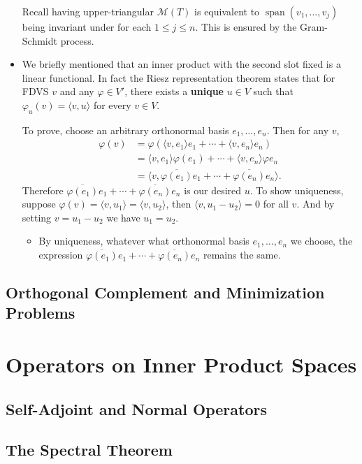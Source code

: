 \documentclass{article}
\newcommand{\s}{\operatorname{span}}
\newcommand{\conj}[1]{\overline{#1}}
\newcommand{\inp}[2]{\langle #1, #2 \rangle}
\newcommand{\M}{\mathcal{M}}
\renewcommand{\phi}{\varphi}
\begin{document}
\begin{itemize}
    Recall having upper-triangular $\M(T)$ is equivalent to $\s(v_1,\dots,v_j)$ being invariant under for each $1 \leq j \leq n$. This is ensured by the Gram-Schmidt process.
    
    
    \item We briefly mentioned that an inner product with the second slot fixed is a linear functional. In fact the Riesz representation theorem states that for FDVS $v$ and any $\phi \in V'$, there exists a \textbf{unique} $u \in V$ such that $\phi_u(v) = \inp{v}{u}$ for every $v \in V$.
    
    To prove, choose an arbitrary orthonormal basis $e_1,\dots,e_n$. Then for any $v$,
    \begin{align*}
        \phi(v) & = \phi(\inp{v}{e_1}e_1+\cdots+\inp{v}{e_n}e_n) \\ & = \inp{v}{e_1}\phi(e_1)+\cdots+\inp{v}{e_n}\phi{e_n} \\ & = \inp{v}{\conj{\phi(e_1)}e_1+\cdots+\conj{\phi(e_n)}e_n}.
    \end{align*}
    Therefore $\conj{\phi(e_1)}e_1+\cdots+\conj{\phi(e_n)}e_n$ is our desired $u$. To show uniqueness, suppose $\phi(v) = \inp{v}{u_1} = \inp{v}{u_2}$, then $\inp{v}{u_1 - u_2} = 0$ for all $v$. And by setting $v = u_1 - u_2$ we have $u_1 = u_2$.
    \begin{itemize}
        \item By uniqueness, whatever what orthonormal basis $e_1,\dots,e_n$ we choose, the expression $\conj{\phi(e_1)}e_1+\cdots+\conj{\phi(e_n)}e_n$ remains the same.
    \end{itemize}
\end{itemize}
\subsection{Orthogonal Complement and Minimization Problems}


\section{Operators on Inner Product Spaces}
\subsection{Self-Adjoint and Normal Operators}

\subsection{The Spectral Theorem}
\end{document}
